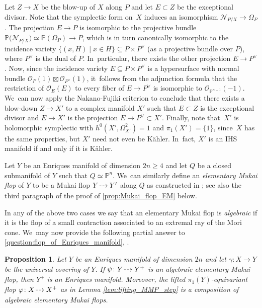\documentclass[JEP,XML,SOM,Unicode,published]{cedram}
\newcommand{\dradpl}{{\hspace*{-2.5mm}\begin{tikzcd}[ampersand replacement=\&,column sep = scriptsize]\mbox{}\ar[r,dashed]\&\mbox{}\end{tikzcd}\hspace*{-2.5mm}}}
\newcommand{\dratst}{{\hspace*{-2.5mm}\begin{tikzcd}[ampersand replacement=\&,column sep = small]\mbox{}\ar[r,dashed]\&\mbox{}\end{tikzcd}\hspace*{-2mm}}}
\let\drascst\dratst
\newcommand{\dra}{\mathchoice{\dradpl}{\dratst}{\drascst}{\drascst}}
\theoremstyle{plain}
\newtheorem{prop}[thm]{Proposition}
\theoremstyle{definition}
\renewcommand{\P}{\mathbb{P}}
\newcommand{\OO}{\mathcal{O}}
\begin{document}
Let $Z \to X$ be the blow-up of $X$ along $P$ and let $E \subset Z$ be the exceptional divisor. Note that the symplectic form on~$X$ induces an isomorphism $\mathcal{N}_{P/X} \to \Omega_P$. The projection $E \to P$ is isomorphic to the projective bundle $\mathbb{P} \bigl(\mathcal{N}_{P/X} \bigr) \simeq \mathbb{P} (\Omega_P) \to P $, which is in turn canonically isomorphic to the incidence variety
$ \bigl\{(x,H) \mid x\in H \bigr\} \subseteq P \times P^\vee$ (as a projective bundle over $P$), where $P^\vee$ is the dual of $P$. In~particular, there exists the other projection $E \to P^\vee$. Now, since the incidence variety $E\subseteq P\times P^\vee$ is a hypersurface with normal bundle $\OO_P (1)\boxtimes\OO_{P^\vee} (1)$, it~follows from the adjunction formula that the restriction of
$\OO_E(E)$ to every fiber of $E\to P^\vee$ is isomorphic to $\OO_{\P^{n-1}} (-1)$. We~can now apply the Nakano-Fujiki criterion to conclude that there exists a blow-down $Z\to X'$ to a complex manifold $X'$ such that $E \subset Z$ is the exceptional divisor and $E \to X'$ is the projection $E\to P^\vee \subset X'$. Finally, note that~$X'$ is holomorphic symplectic with $h^0 (X', \Omega_{X'}^2) = 1$ and $\pi_1(X') = \{ 1 \}$, since~$X$ has the same properties, but $X'$ need not even be Kähler. In~fact, $X'$ is an IHS manifold if and only if it is Kähler.

Let $Y$ be an Enriques manifold of dimension $2n \geq 4$ and let $Q$ be a closed submanifold of $Y$ such that $Q \simeq \P^n$. We~can similarly define an \emph{elementary Mukai flop} of $Y$ to be a Mukai flop $Y \dra Y'$ along $Q$ as constructed in \cite[\S 4, pp.\,1645-1646]{OS11b}; see also the third paragraph of the proof of \autoref{prop:Mukai_flop_EM} below.

In any of the above two cases we say that an elementary Mukai flop is \emph{algebraic} if it is the flop of a small contraction associated to an extremal ray of the Mori cone. We~may now provide the following partial answer to \autoref{question:flop_of_Enriques_manifold}, \cf \cite[Prop.\,4.2]{OS11b}.

\begin{prop}
\label{prop:Mukai_flop_EM}
Let $Y$ be an Enriques manifold of dimension $2n$ and let \hbox{$\gamma \colon X\!\to\! Y$} be the universal covering of $Y$.
If $\psi \colon Y \dra Y^+$ is an algebraic elementary Mukai flop, then $Y^+$ is an Enriques manifold.
Moreover, the lifted $\pi_1(Y)$-equivariant flop $\varphi \colon X \dra X^+$ as in Lemma \ref{lem:lifting_MMP_step} is a composition of algebraic elementary Mukai flops.
\end{prop}
\end{document}
